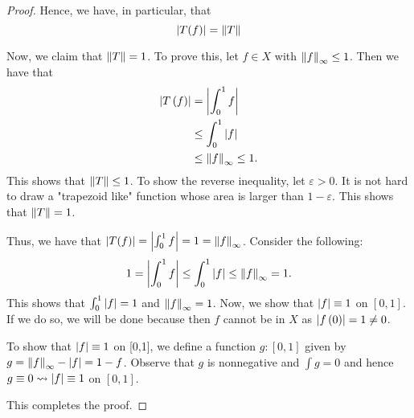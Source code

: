 \begin{proof}
    Hence, we have, in particular, that 
    \begin{equation*}
	\left\lvert T(f) \right\rvert=\left\lVert T \right\rVert
    \end{equation*}
    
    Now, we claim that $\left\lVert T \right\rVert=1$. To prove this, let $f\in X$ with $\left\lVert f \right\rVert_{\infty}\le1$. Then we have that
    \begin{align*}
	\left\lvert T\left( f \right) \right\rvert &=  \left\lvert \int_{0}^{1} f \right\rvert \\
	&\le \int_{0}^{1} \left\lvert f \right\rvert \\
	& \le \left\lVert f \right\rVert_{\infty} \le 1\text{.}
    \end{align*}
    This shows that $\left\lVert T \right\rVert \le 1$. To show the reverse inequality, let $\varepsilon > 0$. It is not hard to draw a "trapezoid like" function whose area is larger than $1-\varepsilon$. This shows that $\left\lVert T \right\rVert=1$.

    Thus, we have that $\left\lvert T(f) \right\rvert=\left\lvert \int_{0}^{1} f \right\rvert = 1 = \left\lVert f \right\rVert_{\infty}$. Consider the following:
    \begin{align*}
	1=\left\lvert \int_{0}^{1} f  \right\rvert \le \int_{0}^{1} \left\lvert f \right\rvert \le \left\lVert f \right\rVert_{\infty} =1\text{.}
    \end{align*}
    This shows that $\int_{0}^{1} \left\lvert f \right\rvert=1$ and $\left\lVert f \right\rVert_{\infty}=1$. Now, we show that $\left\lvert f \right\rvert \equiv 1$ on $[0,1]$. If we do so, we will be done because then $f$ cannot be in $X$ as $\left\lvert f\left( 0 \right) \right\rvert=1 \ne 0$.

    To show that $\left\lvert f \right\rvert\equiv 1$ on [0,1], we define a function $g : \left[ 0,1 \right]$ given by $g=\left\lVert f \right\rVert_{\infty} - \left\lvert f \right\rvert = 1 -f$. Observe that $g$ is nonnegative and $\int g =0$ and hence $g\equiv 0 \leadsto \left\lvert f \right\rvert\equiv 1$ on $[0,1]$.

    This completes the proof.
\end{proof}

